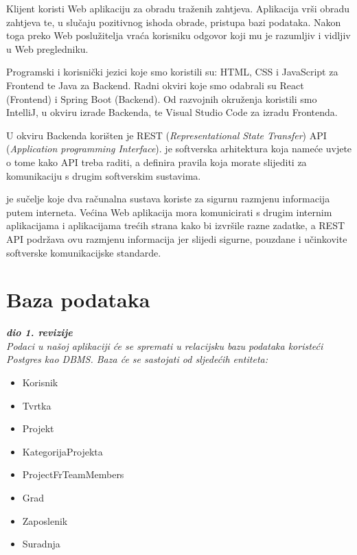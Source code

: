 		{Klijent koristi Web aplikaciju za obradu traženih zahtjeva. Aplikacija vrši obradu zahtjeva te, u slučaju pozitivnog ishoda obrade, pristupa bazi podataka. Nakon toga preko Web poslužitelja vraća korisniku odgovor koji mu je razumljiv i vidljiv u Web pregledniku.}\vspace{0.3cm}

		{Programski i korisnički jezici koje smo koristili su: HTML, CSS i JavaScript za Frontend te Java za Backend. Radni okviri koje smo odabrali su React (Frontend) i Spring Boot (Backend). Od razvojnih okruženja koristili smo IntelliJ, u okviru izrade Backenda, te Visual Studio Code za izradu Frontenda.}\vspace{0.3cm}

		{U okviru Backenda korišten je REST (\textit{Representational State Transfer}) API (\textit{Application programming Interface}).  ​​je softverska arhitektura koja nameće uvjete o tome kako API treba raditi, a  definira pravila koja morate slijediti za komunikaciju s drugim softverskim sustavima.}\vspace{0.3cm}

		{ je sučelje koje dva računalna sustava koriste za sigurnu razmjenu informacija putem interneta. Većina Web aplikacija mora komunicirati s drugim internim aplikacijama i aplikacijama trećih strana kako bi izvršile razne zadatke, a REST API podržava ovu razmjenu informacija jer slijedi sigurne, pouzdane i učinkovite softverske komunikacijske standarde.}\pagebreak
		


				
		\section{Baza podataka}
			
			\textbf{\textit{dio 1. revizije}}\\
			
		\textit{Podaci u našoj aplikaciji će se spremati u relacijsku bazu podataka koristeći Postgres kao DBMS. Baza će se sastojati od sljedećih entiteta:}
		\begin{itemize}
			\item Korisnik
			\item Tvrtka
			\item Projekt
			\item KategorijaProjekta
			\item ProjectFrTeamMembers
			\item Grad
			\item Zaposlenik
			\item Suradnja
		\end{itemize}
